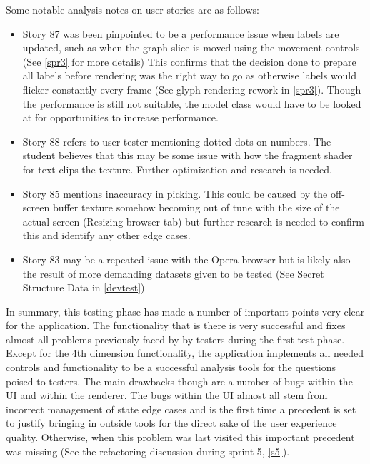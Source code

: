 Some notable analysis notes on user stories are as follows:
\begin{itemize}
    \item Story 87 was been pinpointed to be a performance issue when labels are updated, such as when the graph slice is moved using the movement controls (See \ref{spr3} for more details) This confirms that the decision done to prepare all labels before rendering was the right way to go as otherwise labels would flicker constantly every frame (See glyph rendering rework in \ref{spr3}). Though the performance is still not suitable, the model class would have to be looked at for opportunities to increase performance.
    \item Story 88 refers to user tester mentioning dotted dots on numbers. The student believes that this may be some issue with how the fragment shader for text clips the texture. Further optimization and research is needed.
    \item Story 85 mentions inaccuracy in picking. This could be caused by the off-screen buffer texture somehow becoming out of tune with the size of the actual screen (Resizing browser tab) but further research is needed to confirm this and identify any other edge cases.
    \item Story 83 may be a repeated issue with the Opera browser but is likely also the result of more demanding datasets given to be tested (See Secret Structure Data in \ref{devtest})
\end{itemize}

In summary, this testing phase has made a number of important points very clear for the application. The functionality that is there is very successful and fixes almost all problems previously faced by by testers during the first test phase. Except for the 4th dimension functionality, the application implements all needed controls and functionality to be a successful analysis tools for the questions poised to testers. The main drawbacks though are a number of bugs within the UI and within the renderer. The bugs within the UI almost all stem from incorrect management of state edge cases and is the first time a precedent is set to justify bringing in outside tools for the direct sake of the user experience quality. Otherwise, when this problem was last visited this important precedent was missing (See the refactoring discussion during sprint 5, \ref{s5}).

